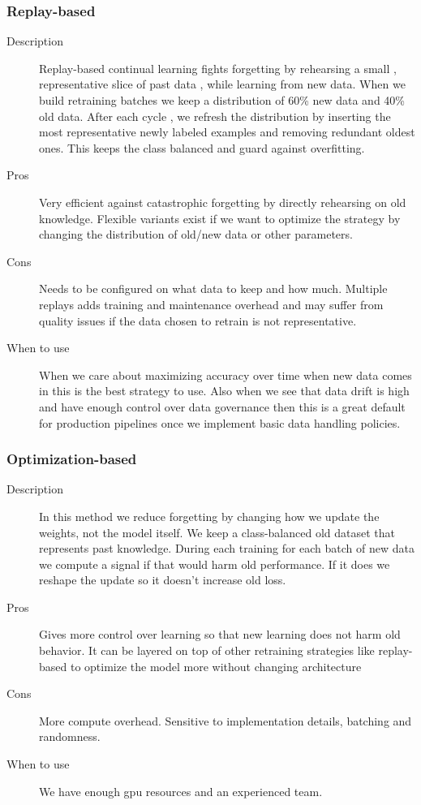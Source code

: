 \subsubsection*{Replay-based}
\begin{description}
  \item[Description] Replay-based continual learning fights forgetting by rehearsing a small , representative slice of past data , while learning from new data. When we build retraining batches we keep a distribution of 60\% new data and 40\% old data. After each cycle , we refresh the distribution by inserting the most representative newly labeled examples and removing redundant oldest ones. This keeps the class balanced and guard against overfitting.
  \item[Pros] Very efficient against catastrophic forgetting by directly rehearsing on old knowledge. Flexible variants exist if we want to optimize the strategy by changing the distribution of old/new data or other parameters.
  \item[Cons] Needs to be configured on what data to keep and how much. Multiple replays adds training and maintenance overhead and may suffer from quality issues if the data chosen to retrain is not representative.
  \item[When to use] When we care about maximizing accuracy over time when new data comes in this is the best strategy to use. Also when we see that data drift is high and have enough control over data governance then this is a great default for production pipelines once we implement basic data handling policies.
\end{description}

\subsubsection*{Optimization-based}
\begin{description}
  \item[Description] In this method we reduce forgetting by changing how we update the weights, not the model itself. We keep a class-balanced old dataset that represents past knowledge. During each training for each batch of new data we compute a signal if that would harm old performance. If it does we reshape the update so it doesn’t increase old loss.
  \item[Pros] Gives more control over learning so that new learning does not harm old behavior. It can be layered on top of other retraining strategies like replay-based to optimize the model more without changing architecture
  \item[Cons] More compute overhead. Sensitive to implementation details, batching and randomness.
  \item[When to use] We have enough gpu resources and an experienced team.
\end{description}

